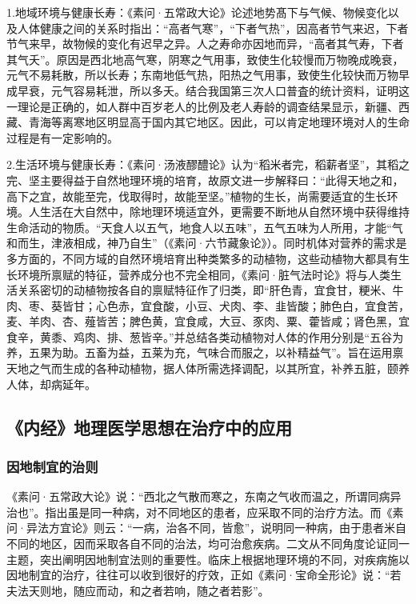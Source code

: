 \documentclass[draft,12pt]{ctexbook}
\begin{document}
1.地域环境与健康长寿：《素问·五常政大论》论述地势髙下与气候、物候变化以及人体健康之间的关系时指出：“高者气寒”，“下者气热”，因高者节气来迟，下者节气来早，故物候的变化有迟早之异。人之寿命亦因地而异，“高者其气寿，下者其气夭”。原因是西北地高气寒，阴寒之气用事，致使生化较慢而万物晚成晚衰，元气不易耗散，所以长寿；东南地低气热，阳热之气用事，致使生化较快而万物早成早衰，元气容易耗泄，所以多夭。结合我国第三次人口普査的统计资料，证明这一理论是正确的，如人群中百岁老人的比例及老人寿龄的调查结杲显示，新疆、西藏、青海等离寒地区明显高于国内其它地区。因此，可以肯定地理环境对人的生命过程是有一定影响的。

2.生活环境与健康长寿：《素问·汤液醪醴论》认为“稻米者完，稻薪者坚”，其稻之完、坚主要得益于自然地理环境的培育，故原文进一步解释曰：“此得天地之和，高下之宜，故能至完，伐取得时，故能至坚。”植物的生长，尚需要适宜的生长环境。人生活在大自然中，除地理环境适宜外，更需要不断地从自然环境中获得维持生命活动的物质。“天食人以五气，地食人以五味”，五气五味为人所用，才能“气和而生，津液相成，神乃自生”（《素问·六节藏象论》）。同时机体对营养的需求是多方面的，不同方域的自然环境培育出种类繁多的动植物，这些动植物大都具有生长环境所禀赋的特征，营养成分也不完全相同，《素问·脏气法时论》将与人类生活关系密切的动植物按各自的禀赋特征作了归类，即“肝色青，宜食甘，粳米、牛肉、枣、葵皆甘；心色赤，宜食酸，小豆、犬肉、李、韭皆酸；肺色白，宜食苦，麦、羊肉、杏、薤皆苦；脾色黄，宜食咸，大豆、豕肉、粟、藿皆咸；肾色黑，宜食辛，黄黍、鸡肉、排、葱皆辛。”并总结各类动植物对人体的作用分别是“五谷为养，五果为助。五畜为益，五莱为充，气味合而服之，以补精益气”。旨在运用禀天地之气而生成的各种动植物，据人体所需选择调配，以其所宜，补养五脏，颐养人体，却病延年。

\subsection{《内经》地理医学思想在治疗中的应用}%

\subsubsection{因地制宜的治则}%

《素问·五常政大论》说：“西北之气散而寒之，东南之气收而温之，所谓同病异治也”。指出虽是同一种病，对不同地区的患者，应采取不同的治疗方法。而《素问·异法方宜论》则云：“一病，治各不同，皆愈”，说明同一种病，由于患者米自不同的地区，因而采取各自不同的治法，均可治愈疾病。二文从不同角度论证同一主题，突出阐明因地制宜法则的重要性。临床上根据地理环境的不同，对疾病施以因地制宜的治疗，往往可以收到很好的疗效，正如《素问·宝命全形论》说：“若夫法天则地，随应而动，和之者若响，随之者若影”。
\end{document}
